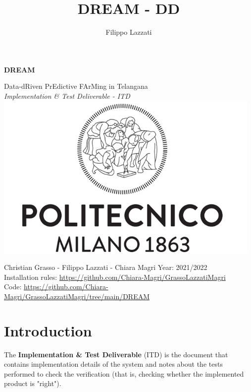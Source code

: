 \documentclass{article}
\title{DREAM - DD}
\author{Filippo Lazzati}
\begin{document}
\thispagestyle{empty} 
\begin{titlepage}
    \begin{center}
       {\Huge \textbf{DREAM}} %
       \vspace{0.5cm}
       \\
    \begin{LARGE}
        {Data-dRiven PrEdictive FArMing in Telangana}
        \vspace{1.0cm}
        \\
        {\textit{Implementation \& Test Deliverable - ITD}}
        \includegraphics[width=13cm]{logo/polimi.png}
       \vspace{1.0cm}
        
        {Christian Grasso - Filippo Lazzati - Chiara Magri}
       \vspace{0.5cm}
       {Year: 2021/2022}
       \\
       {Installation rules: \url{https://github.com/Chiara-Magri/GrassoLazzatiMagri}}\\
       {Code: \url{https://github.com/Chiara-Magri/GrassoLazzatiMagri/tree/main/DREAM}}
       
    \end{LARGE}  
   \end{center}
\end{titlepage}
\newpage
\tableofcontents 
\newpage
\section{Introduction}
The \textbf{Implementation \& Test Deliverable} (ITD) is the document that contains implementation details of the system and notes about the tests performed to check the verification (that is, checking whether the implemented product is "right").
\end{document}
